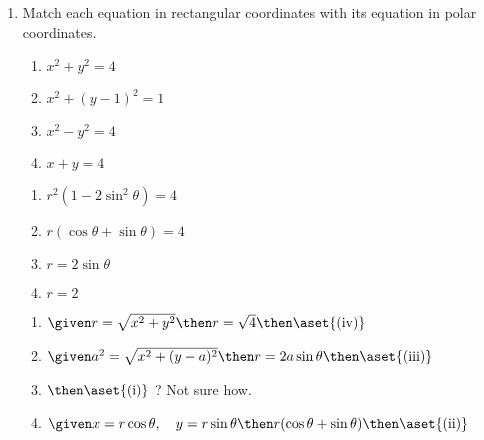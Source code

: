\begin{enumerate}
\newpage %

  \item Match each equation in rectangular coordinates with its equation in
    polar coordinates.

  \begin{multicols}{2}
    \begin{enumerate}
      \item \(x^2 + y^2 = 4\)
      \item \(x^2 + (y-1)^2 = 1\)
      \item \(x^2 - y^2 = 4\)
      \item \(x + y = 4\)
    \end{enumerate}

    \begin{enumerate}[label=(\roman*)]
      \item \(r^2 (1- 2 \sin ^2 \theta) = 4\)
      \item \(r (\cos \theta + \sin \theta ) = 4\)
      \item \(r = 2\sin \theta\)
      \item \(r = 2 \)
    \end{enumerate}
  \end{multicols}

  \vspace{1em}
  \begin{center}
  \end{center}

  \begin{enumerate}
    \item \(\given r = \sqrt{x^2 + y^2} \then r = \sqrt{4} \then \aset{(\text{iv})}\)
    \item \(\given a^2 = \sqrt{x^2 + (y-a)^2} \then r = 2a \sin \theta \then \aset{(\text{iii})}\)
    \item \(\then \aset{(\text{i})}\) ? Not sure how.
    \item \(\given x = r\cos\theta, \quad y = r \sin \theta \then r(\cos\theta + \sin \theta) \then \aset{(\text{ii})}\)
  \end{enumerate}

  \vspace{4em}


\end{enumerate}
